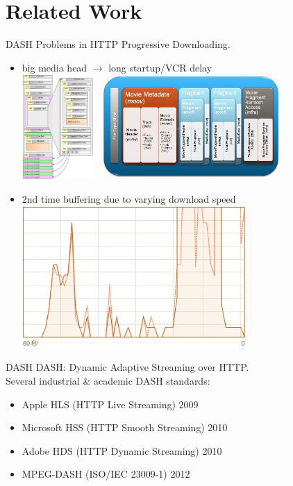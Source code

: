 \documentclass{beamer}
\begin{document}
\section{Related Work}
\begin{frame}{DASH}
	Problems in HTTP Progressive Downloading. 
	\begin{itemize}
		\item<1> big media head $\longrightarrow$ long startup/VCR delay\\
		\includegraphics[height=4cm]{fig/MP4_boxes_detail.jpg}
		\includegraphics[height=4cm]{fig/fragmented_mp4.jpg}
	\end{itemize}
\end{frame}
\begin{frame}
	\begin{itemize}
		\item<1> 2nd time buffering due to varying download speed\\
		\includegraphics[height=5.4cm]{fig/download_speed.png}
	\end{itemize}
\end{frame}
\begin{frame}{DASH}
	DASH: Dynamic Adaptive Streaming over HTTP. \\
	Several industrial \& academic DASH standards: 
	\begin{itemize}
		\item<1> Apple HLS (HTTP Live Streaming) 2009
		\item<1> Microsoft HSS (HTTP Smooth Streaming) 2010
		\item<1> Adobe HDS (HTTP Dynamic Streaming) 2010
		\item<1> MPEG-DASH (ISO/IEC 23009-1) 2012
	\end{itemize}
\end{frame}
\end{document}
